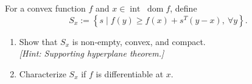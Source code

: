\documentclass[11pt,letter,notitlepage]{article}
\theoremstyle{definition}
\begin{document}
\newpage
\begin{exercise}[ ]
For a convex function $f$ and $x \in \operatorname{int}\;\operatorname{dom} f$, define
\[
S_x := \left\{ s \mid f(y) \ge f(x) + s^T (y-x),\ \forall y \right\}.
\]

\begin{enumerate}
    \item[(a)] Show that $S_x$ is non-empty, convex, and compact. \\
    \textit{[Hint: Supporting hyperplane theorem.]}
    
    \item[(b)] Characterize $S_x$ if $f$ is differentiable at $x$.
\end{enumerate}
\end{exercise}

\newpage
\end{document}
